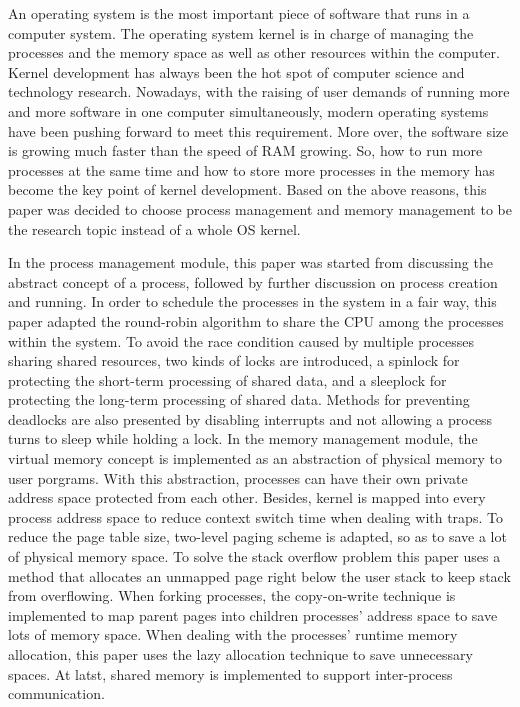 \documentclass{swfuthesism}
\begin{document}
\begin{EAbstract}
  An operating system is the most important piece of software that runs in a computer
  system. The operating system kernel is in charge of managing the processes and the
  memory space as well as other resources within the computer. Kernel development has
  always been the hot spot of computer science and technology research. Nowadays, with the
  raising of user demands of running more and more software in one computer
  simultaneously, modern operating systems have been pushing forward to meet this
  requirement. More over, the software size is growing much faster than the speed of RAM
  growing. So, how to run more processes at the same time and how to store more processes
  in the memory has become the key point of kernel development. Based on the above
  reasons, this paper was decided to choose process management and memory management to be
  the research topic instead of a whole OS kernel.

  In the process management module, this paper was started from discussing the abstract
  concept of a process, followed by further discussion on process creation and running. In
  order to schedule the processes in the system in a fair way, this paper adapted the
  round-robin algorithm to share the CPU among the processes within the system. To avoid
  the race condition caused by multiple processes sharing shared resources, two kinds of
  locks are introduced, a spinlock for protecting the short-term processing of shared
  data, and a sleeplock for protecting the long-term processing of shared data. Methods
  for preventing deadlocks are also presented by disabling interrupts and not allowing a
  process turns to sleep while holding a lock. In the memory management module, the
  virtual memory concept is implemented as an abstraction of physical memory to user
  porgrams. With this abstraction, processes can have their own private address space
  protected from each other. Besides, kernel is mapped into every process address space to
  reduce context switch time when dealing with traps. To reduce the page table size,
  two-level paging scheme is adapted, so as to save a lot of physical memory space. To
  solve the stack overflow problem this paper uses a method that allocates an unmapped
  page right below the user stack to keep stack from overflowing. When forking processes,
  the copy-on-write technique is implemented to map parent pages into children processes'
  address space to save lots of memory space. When dealing with the processes' runtime
  memory allocation, this paper uses the lazy allocation technique to save unnecessary
  spaces. At latst, shared memory is implemented to support inter-process communication.
\end{EAbstract}
\end{document}
